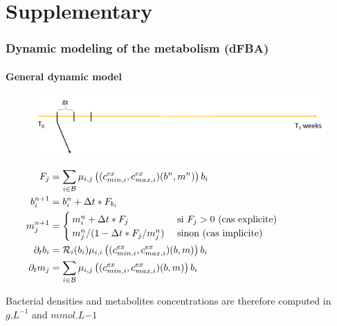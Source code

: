 \documentclass[8pt,usenames,dvipsnames]{beamer}
\begin{document}
\section{Supplementary}
\begin{frame}[noframenumbering]
\frametitle{Dynamic modeling of the metabolism (dFBA)}
\framesubtitle{General dynamic model}
\begin{figure}[t]
\includegraphics[width=\textwidth]{figures/time-dfba.pdf}
\end{figure}
\begin{align}
\hspace{-2cm}
F_j & =\sum_{i \in \mathcal{B}} {\mu}_{i,j}\left((c^{ex}_{min,i},c^{ex}_{max,i})(b^n,m^n)\right) b_i \\
\hspace{-2cm}
b_i^{n+1}& = b_i^n+\Delta t* F_{b_i} \\
\hspace{-2cm}
m_j^{n+1}& = \begin{cases} m_i^n+\Delta t* F_{j} & \text{ si } F_j>0 \text{ (cas explicite)}\\
m_j^n/(1-\Delta t * F_j/m_j^n) & \text{ sinon (cas implicite)}
\end{cases}\\
\hspace{-2cm}
    \partial_t b_i& = \mathcal{R}_{i}(b_i) {\mu}_{i,i}\left((c^{ex}_{min,i},c^{ex}_{max,i})(b,m)\right) b_i  \\
    \hspace{-2cm}
    \partial_t m_j &= \sum_{i \in \mathcal{B}} {\mu}_{i,j}\left((c^{ex}_{min,i},c^{ex}_{max,i})(b,m)\right) b_i 
\end{align}

\begin{block}{}
Bacterial densities and metabolites concentrations are therefore computed in $g.L^{-1}$ and $mmol.L{-1}$ 
\end{block}

\end{frame}

\tiny
\printbibliography
\end{document}
